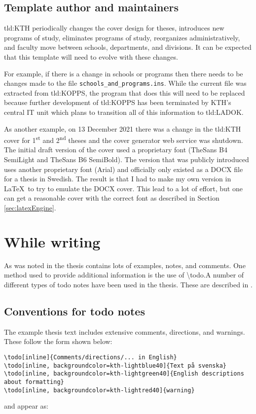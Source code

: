 \subsection{Template author and maintainers}
\label{sec:maintainer}

\gls{tld:KTH} periodically changes the cover design for theses, introduces new programs of study, eliminates programs of study, reorganizes administratively,
and faculty move between schools, departments, and divisions. It can be expected that this template will need to evolve with these changes.

For example, if there is a change in schools or programs then there needs to be changes made to the file \texttt{schools\_and\_programs.ins}. While the current file was extracted from \gls{tld:KOPPS}, the program that does this will need to be replaced because further development of \gls{tld:KOPPS} has been terminated by KTH's central IT unit which plans to transition all of this information to \gls{tld:LADOK}.

As another example, on 13 December 2021 there was a change in the \gls{tld:KTH} cover for 1\textsuperscript{st} and 2\textsuperscript{nd} theses and the cover generator web service was shutdown. The initial draft version of the cover used a proprietary font (TheSans B4 SemiLight and TheSans B6 SemiBold). The version that was publicly introduced uses another proprietary font (Arial) and officially only existed as a DOCX file for a thesis in Swedish. The result is that I had to make my own version in \LaTeX\ to try to emulate the DOCX cover. This lead to a lot of effort, but one can get a reasonable cover with the correct font as described in Section \ref{sec:latexEngine}.

\section{While writing}
As was noted in  the thesis contains lots of examples, notes, and comments. One method used to provide additional information is the use of \textbackslash todo.A number of different types of todo notes have been used in the thesis. These are described in .

\subsection{Conventions for todo notes}
\label{sec:todonotes}
The example thesis text includes extensive comments, directions, and warnings. These follow the form shown below:
\begin{lstlisting}
\todo[inline]{Comments/directions/... in English}
\todo[inline, backgroundcolor=kth-lightblue40]{Text på svenska}
\todo[inline, backgroundcolor=kth-lightgreen40]{English descriptions about formatting}
\todo[inline, backgroundcolor=kth-lightred40]{warning}  
\end{lstlisting}
and appear as:

